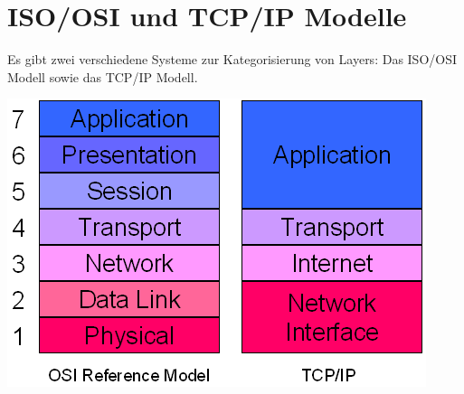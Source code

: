 \section{ISO/OSI und TCP/IP Modelle}

Es gibt zwei verschiedene Systeme zur Kategorisierung von Layers: Das ISO/OSI
Modell sowie das TCP/IP Modell.

\includegraphics[width=\textwidth]{media/osi_vs_ip.png}
